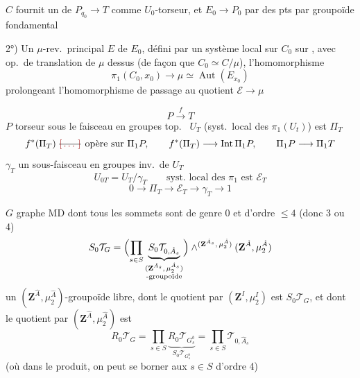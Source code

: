 \documentclass[11pt,a4paper]{article}
\begin{document}
 $C$ fournit un  de $P_{q_0} \to T$ comme $U_0$-torseur,
et $E_0 \to P_0$ par  des pts par groupoïde fondamental

2°) Un  $\mu$-rev.\ principal  $E$ de $E_0$, défini par un système
local sur $C_0$ sur , avec op.\ de translation de $\mu$ dessus (de façon que
$C_0 \simeq C/\mu$), l'homomorphisme
\[
  \pi_1(C_0, x_0) \longrightarrow \mu \simeq \operatorname{Aut}(E_{x_0})
\]
prolongeant  l'homomorphisme de passage au quotient
$\mathcal{E} \to \mu$

\[
  P \xrightarrow{\;f\;} T
\]
$P$ \struck{\ill{}} torseur sous le faisceau en groupes top.\ 
\ill{} $U_T$ (syst.\ local des $\pi_1(U_t)$) est $\Pi_T$
\[
  f^*(\Pi_T) \text{ \struck{\ill{}} opère sur } \Pi_1 P, \qquad
  f^*(\Pi_T) \longrightarrow \operatorname{Int} \Pi_1 P,
  \qquad \Pi_1 P \longrightarrow \Pi_1 T
\]
$\gamma_T$ un sous-faisceau en groupes inv.\ de $U_T$ 
\[
  U_{0T} = U_T / \gamma_T \qquad \text{syst.\ local des } \pi_1 \text{ est } \mathcal{E}_T
\]
\[
  0 \longrightarrow \Pi_T \longrightarrow \mathcal{E}_T \longrightarrow \gamma_T \longrightarrow 1
\]


$G$ graphe MD dont tous les sommets sont de genre 0 et d'ordre $\leq 4$ (donc 3 ou 4)
\[
  S_0\mathcal{T}_G =
  \Bigl(\prod_{s \in S}
  \underbrace{S_0\mathcal{T}_{0,\hat{A}_s}}_{\substack{(\mathbf{Z}^{\hat{A}_s},\, \mu_2^{\hat{A}_s})\\ \text{-groupoïde}}}
  \Bigr)
  \wedge^{(\mathbf{Z}^{\hat{A}_s},\, \mu_2^{\hat{A}})}
  (\mathbf{Z}^{\hat{A}}, \mu_2^{\hat{A}})
\]
un $(\mathbf{Z}^{\hat{A}}, \mu_2^{\hat{A}})$-groupoïde libre, dont le quotient par
$(\mathbf{Z}^I, \mu_2^I)$ est \struck{\ill{}} $S_0\mathcal{T}_G$, et dont le quotient par
$(\mathbf{Z}^{\hat{A}}, \mu_2^{\hat{A}})$ est
\[
  R_0\mathcal{T}_G = \prod_{s \in S}
  \underbrace{R_0\mathcal{T}_{G_s^b}}_{S_0\mathcal{T}_{G_s^b}}
  = \prod_{s \in S} \mathcal{T}_{0,\hat{A}_s}
\]
(où dans le produit, on peut se borner aux $s \in S$ d'ordre 4)
\end{document}
